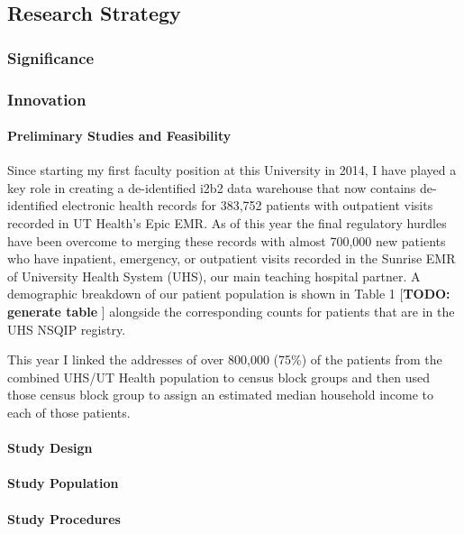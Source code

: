 \subsection{Research Strategy}\label{research-strategy}


\subsubsection{Significance}\label{significance}

\subsubsection{Innovation}\label{innovation}

\paragraph{Preliminary Studies and Feasibility}\label{preliminary-studies-and-feasibility} 
Since starting my first faculty position at this University in 2014, I have played a key role in creating a de-identified i2b2 data warehouse that now contains de-identified electronic health records for 383,752 patients with outpatient visits recorded in UT Health's Epic EMR. As of this year the final regulatory hurdles have been overcome to merging these records with almost 700,000 new patients who have inpatient, emergency, or outpatient visits recorded in the Sunrise EMR of University Health System (UHS), our main teaching hospital partner. A demographic breakdown of our patient population is shown in Table 1 [\textbf{TODO: generate table }] alongside the corresponding counts for patients that are in the UHS NSQIP registry.

This year I linked the addresses of over 800,000 (75\%) of the patients from the combined UHS/UT Health population to census block groups and then used those census block group to assign an estimated median household income to each of those patients. 


\paragraph{Study Design}\label{study-design}


\paragraph{Study Population}\label{study-population}


\paragraph{Study Procedures}\label{study-procedures}


